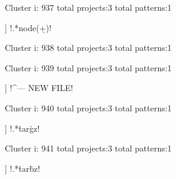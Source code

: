 Cluster i: 937
total projects:3
total patterns:1
\begin{multicols}{1}
\begin{description}[noitemsep,topsep=0pt]
\item [[3] ] \cverb!.*node(\d+)!
\end{description}
\end{multicols}







Cluster i: 938
total projects:3
total patterns:1
\begin{multicols}{1}
\end{multicols}







Cluster i: 939
total projects:3
total patterns:1
\begin{multicols}{1}
\begin{description}[noitemsep,topsep=0pt]
\item [[3] ] \cverb!^--- NEW FILE!
\end{description}
\end{multicols}







Cluster i: 940
total projects:3
total patterns:1
\begin{multicols}{1}
\begin{description}[noitemsep,topsep=0pt]
\item [[3] ] \cverb!.*\.tar\.gz!
\end{description}
\end{multicols}







Cluster i: 941
total projects:3
total patterns:1
\begin{multicols}{1}
\begin{description}[noitemsep,topsep=0pt]
\item [[3] ] \cverb!.*\.tar\.bz!
\end{description}
\end{multicols}







